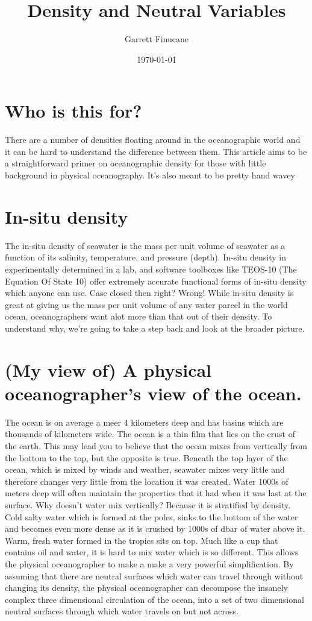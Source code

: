 \documentclass[11pt]{article}
\author{Garrett Finucane}
\date{\today}
\title{Density and Neutral Variables}
\begin{document}
\maketitle
\tableofcontents



\section{Who is this for?}
\label{sec:orgff76838}
There are a number of densities floating around in the oceanographic world and it can be hard to understand the difference between them. This article aims to be a straightforward primer on oceanographic density for those with little background in physical oceanography. It's also meant to be pretty hand wavey
\section{In-situ density}
\label{sec:org6309d08}
The in-situ density of seawater is the mass per unit volume of seawater as a function of its salinity, temperature, and pressure (depth).  In-situ density in experimentally determined in a lab, and software toolboxes like TEOS-10 (The Equation Of State 10) offer extremely accurate functional forms of in-situ density which anyone can use. Case closed then right? Wrong! While in-situ density is great at giving us the mass per unit volume of any water parcel in the world ocean, oceanographers want alot more than that out of their density. To understand why, we're going to take a step back and look at the broader picture.

\section{(My view of) A physical oceanographer's view of the ocean.}
\label{sec:orgc35b95b}
The ocean is on average a meer 4 kilometers deep and has basins which are thousands of kilometers wide. The ocean is a thin film that lies on the crust of the earth. This may lead you to believe that the ocean mixes from vertically from the bottom to the top, but the opposite is true. Beneath the top layer of the ocean, which is mixed by winds and weather, seawater mixes very little and therefore changes very little from the location it was created. Water 1000s of meters deep will often maintain the properties that it had when it was last at the surface.
Why doesn't water mix vertically? Because it is stratified by density. Cold salty water which is formed at the poles, sinks to the bottom of the water and becomes even more dense as it is crushed by 1000s of dbar of water above it. Warm, fresh water formed in the tropics sits on top. Much like a cup that contains oil and water, it is hard to mix water which is so different. This allows the physical oceanographer to make a make a very powerful simplification. By assuming that there are neutral surfaces which water can travel through without changing its density, the physical oceanographer can decompose the insanely complex three dimensional circulation of the ocean, into a set of two dimensional neutral surfaces through which water travels on but not across. 
\end{document}
